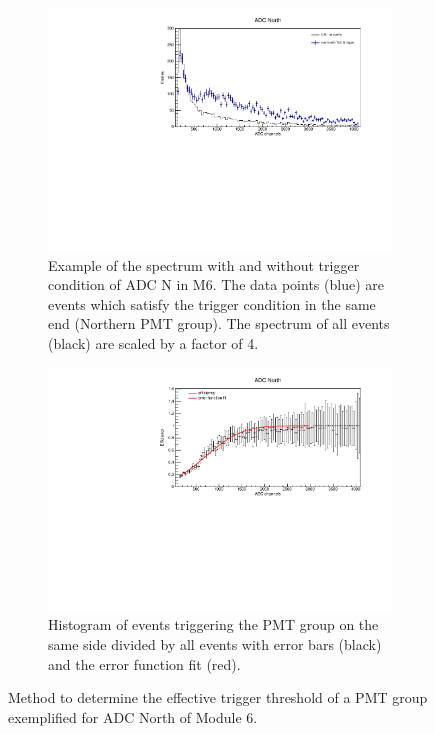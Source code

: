 \begin{figure}[ht]
  \centering
  \begin{subfigure}{0.7\linewidth}
    \includegraphics[width=\linewidth{}]{./fig/M6AdcNorth2Histo.pdf}
    \caption{Example of the spectrum with and without trigger condition of ADC N in M6. The data points (blue) are events which satisfy the trigger condition in the same end (Northern PMT group). The spectrum of all events (black) are scaled by a factor of 4.}
    \label{fig:2HistoM6}
  \end{subfigure}
  \begin{subfigure}{0.7\linewidth}
    \includegraphics[width=\linewidth{}]{./fig/M6AdcNortheff_late.pdf}
    \caption{Histogram of events triggering the PMT group on the same side divided by all events with error bars (black) and the error function fit (red).}
    \label{fig:eff_lateM6}
  \end{subfigure}
  \caption{Method to determine the effective trigger threshold of a PMT group exemplified for ADC North of Module 6.}
  \label{fig:threshold_example}
\end{figure}

